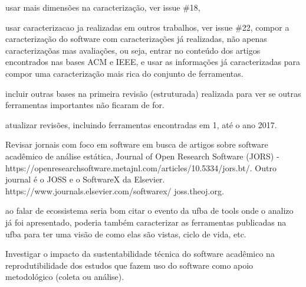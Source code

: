 
usar mais dimensões na caracterização, ver issue \#18, 

usar caracterizacao ja realizadas em outros trabalhos, ver issue \#22,
compor a caracterização do software com caracterizações já realizadas,
não apenas caracterizaçõas mas avaliações, ou seja, entrar no conteúdo
dos artigos encontrados nas bases ACM e IEEE, e usar as informações
já caracterizadas para compor uma caracterização mais rica
do conjunto de ferramentas.

incluir outras bases na primeira revisão (estruturada) realizada para
ver se outras ferramentas importantes não ficaram de for.

atualizar revisões, incluindo ferramentas encontradas em 1, até o ano 2017. 

Revisar jornais com foco em software em busca de artigos sobre
software acadêmico de análise estática, 
Journal of Open Research Software (JORS) -
 https://openresearchsoftware.metajnl.com/articles/10.5334/jors.bt/.
Outro journal é o JOSS e o SoftwareX da Elsevier. https://www.journals.elsevier.com/softwarex/ joss.theoj.org.

ao falar de ecossistema seria bom citar o evento da ufba de tools onde o
analizo já foi apresentado, poderia também caracterizar as ferramentas
publicadas na ufba para ter uma visão de como elas são vistas, ciclo de vida,
etc.

Investigar o impacto da sustentabilidade técnica do software acadêmico na
reprodutibilidade dos estudos que fazem uso do software como apoio metodológico
(coleta ou análise).




